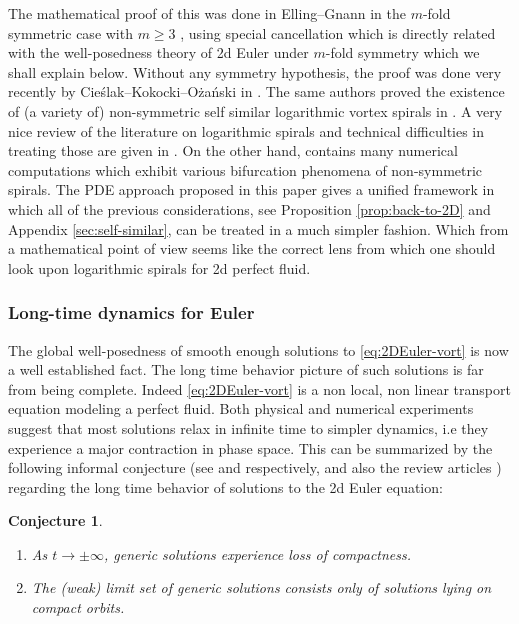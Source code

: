 \documentclass[JEP,XML,SOM,Unicode,NoFloatCountersInSection,published]{cedram}
\theoremstyle{plain}
\newtheorem{conjecture}[theorem]{Conjecture}
\theoremstyle{definition}
\begin{document}
The mathematical proof of this was done in Elling--Gnann in the $m$-fold symmetric case with $m\ge3$ \cite{Elling-Gnann}, using special cancellation which is directly related with the well-posedness theory of 2d Euler under $m$-fold symmetry which we shall explain below. Without any symmetry hypothesis, the proof was done very recently by Cie{\'s}lak--Kokocki--O{\.z}a{\'n}ski in \cite{CKW21}. The same authors proved the existence of (a variety of) non-symmetric self similar logarithmic vortex spirals in \cite{CKW22}. A very nice review of the literature on logarithmic spirals and technical difficulties in treating those are given in \cite{CKW21,CKW22}. On the other hand, \cite{Elling-Gnann} contains many numerical computations which exhibit various bifurcation phenomena of non-symmetric spirals. The PDE approach proposed in this paper gives a unified framework in which all of the previous considerations, see Proposition \ref{prop:back-to-2D} and Appendix \ref{sec:self-similar}, can be treated in a much simpler fashion. Which from a mathematical point of view seems like the correct lens from which one should look upon logarithmic spirals for 2d perfect fluid.

\subsubsection*{Long-time dynamics for Euler}
The global well-posedness of smooth enough solutions to \eqref{eq:2DEuler-vort} is now a well established fact. The long time behavior picture of such solutions is far from being complete. Indeed \eqref{eq:2DEuler-vort} is a non local, non linear transport equation modeling a perfect fluid. Both physical and numerical experiments suggest that most solutions relax in infinite time to simpler dynamics, i.e they experience a major contraction in phase space. This can be summarized by the following informal conjecture (see \cite{Sverakcours} and \cite{Shnirelman} respectively, \cite{EMS} and also the review articles \cite{ED-review,Shnirelman-turvey}) regarding the long time behavior of solutions to the 2d Euler equation:

\skpt
\begin{conjecture}\label{conj:losscompactnessandcompactorbits}
\begin{enumerate}
\item As $t\to\pm\infty$, generic solutions experience loss of compactness.
\item The (weak) limit set of generic solutions consists only of solutions lying on compact orbits.
\end{enumerate}
\end{conjecture}
\end{document}
